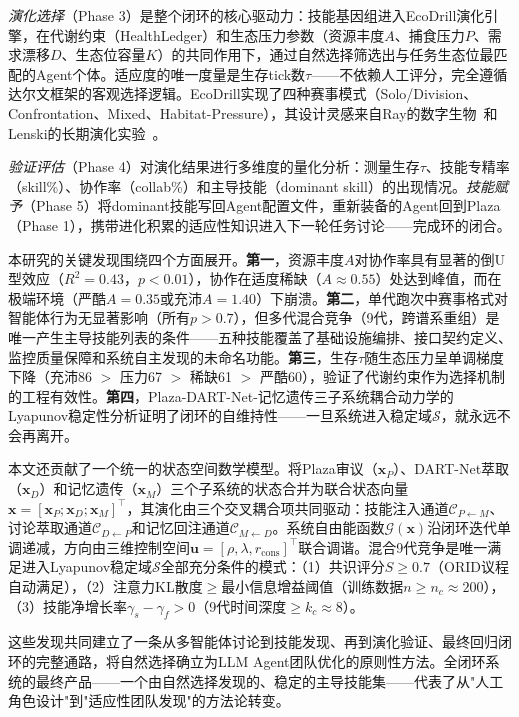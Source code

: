 \documentclass[12pt,a4paper]{ctexart}
\def\cC{\mathcal{C}}
\def\cG{\mathcal{G}}
\begin{document}
\emph{演化选择}（Phase 3）是整个闭环的核心驱动力：技能基因组进入EcoDrill演化引擎，在代谢约束（HealthLedger）和生态压力参数（资源丰度$A$、捕食压力$P$、需求漂移$D$、生态位容量$K$）的共同作用下，通过自然选择筛选出与任务生态位最匹配的Agent个体。适应度的唯一度量是生存tick数$\tau$——不依赖人工评分，完全遵循达尔文框架的客观选择逻辑。EcoDrill实现了四种赛事模式（Solo/Division、Confrontation、Mixed、Habitat-Pressure），其设计灵感来自Ray的数字生物~\cite{ray1991tierra}和Lenski的长期演化实验~\cite{lenski2003evolutionary}。

\emph{验证评估}（Phase 4）对演化结果进行多维度的量化分析：测量生存$\tau$、技能专精率（skill\%）、协作率（collab\%）和主导技能（dominant skill）的出现情况。\emph{技能赋予}（Phase 5）将dominant技能写回Agent配置文件，重新装备的Agent回到Plaza（Phase 1），携带进化积累的适应性知识进入下一轮任务讨论——完成环的闭合。

本研究的关键发现围绕四个方面展开。\textbf{第一}，资源丰度$A$对协作率具有显著的倒U型效应（$R^2=0.43$，$p<0.01$），协作在适度稀缺（$A\approx0.55$）处达到峰值，而在极端环境（严酷$A=0.35$或充沛$A=1.40$）下崩溃。\textbf{第二}，单代跑次中赛事格式对智能体行为无显著影响（所有$p>0.7$），但多代混合竞争（9代，跨谱系重组）是唯一产生主导技能列表的条件——五种技能覆盖了基础设施编排、接口契约定义、监控质量保障和系统自主发现的未命名功能。\textbf{第三}，生存$\tau$随生态压力呈单调梯度下降（充沛86 $>$ 压力67 $>$ 稀缺61 $>$ 严酷60），验证了代谢约束作为选择机制的工程有效性。\textbf{第四}，Plaza-DART-Net-记忆遗传三子系统耦合动力学的Lyapunov稳定性分析证明了闭环的自维持性——一旦系统进入稳定域$\mathcal{S}$，就永远不会再离开。

本文还贡献了一个统一的状态空间数学模型。将Plaza审议（$\mathbf{x}_P$）、DART-Net萃取（$\mathbf{x}_D$）和记忆遗传（$\mathbf{x}_M$）三个子系统的状态合并为联合状态向量$\mathbf{x} = [\mathbf{x}_P; \mathbf{x}_D; \mathbf{x}_M]^\top$，其演化由三个交叉耦合项共同驱动：技能注入通道$\cC_{P\leftarrow M}$、讨论萃取通道$\cC_{D\leftarrow P}$和记忆回注通道$\cC_{M\leftarrow D}$。系统自由能函数$\cG(\mathbf{x})$沿闭环迭代单调递减，方向由三维控制空间$\mathbf{u} = [\rho, \lambda, r_{\text{cons}}]^\top$联合调谐。混合9代竞争是唯一满足进入Lyapunov稳定域$\mathcal{S}$全部充分条件的模式：（1）共识评分$S \geq 0.7$（ORID议程自动满足），（2）注意力KL散度$\geq$最小信息增益阈值（训练数据$n \geq n_c \approx 200$），（3）技能净增长率$\gamma_s - \gamma_f > 0$（9代时间深度$\geq k_c \approx 8$）。

这些发现共同建立了一条从多智能体讨论到技能发现、再到演化验证、最终回归闭环的完整通路，将自然选择确立为LLM Agent团队优化的原则性方法。全闭环系统的最终产品——一个由自然选择发现的、稳定的主导技能集——代表了从"人工角色设计"到"适应性团队发现"的方法论转变。
\end{document}
